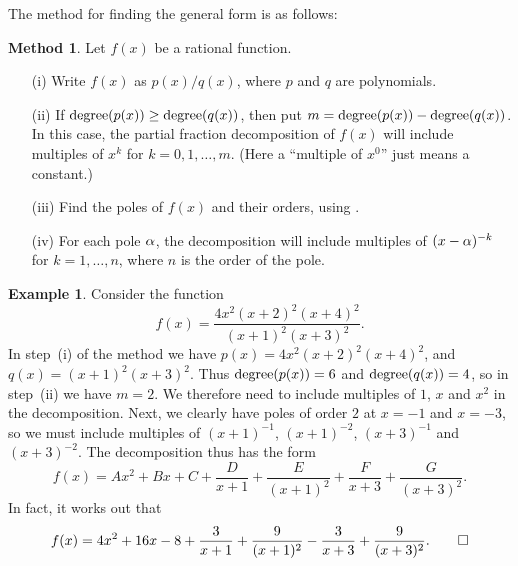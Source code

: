 \documentclass[a4paper]{book}
\theoremstyle{definition}
\newtheorem{example}[theorem]{Example}
\newtheorem{method}[theorem]{Method}
\begin{document}
The method for finding the general form is as follows:
\begin{method}
 Let $f(x)$ be a rational function.
 \begin{itemize}
  \item[(i)] Write $f(x)$ as $p(x)/q(x)$, where $p$ and $q$ are
   polynomials.
  \item[(ii)] If $\operatorname{degree}(p(x))\geq\operatorname{degree}(q(x))$, then put
   $m=\operatorname{degree}(p(x))-\operatorname{degree}(q(x))$.  In this case, the partial
   fraction decomposition of $f(x)$ will include multiples of $x^k$
   for $k=0,1,\dotsc,m$.  (Here a ``multiple of $x^0$'' just means a
   constant.) 
  \item[(iii)] Find the poles of $f(x)$ and their orders, using
   . 
  \item[(iv)] For each pole $\alpha$, the decomposition will include
   multiples of $(x-\alpha)^{-k}$ for $k=1,\dotsc,n$, where $n$ is the
   order of the pole.
 \end{itemize}
\end{method}
\begin{example}
 Consider the function
 \[ f(x) = \frac{4x^2(x+2)^2(x+4)^2}{(x+1)^2(x+3)^2}. \]
 In step~(i) of the method we have $p(x)=4x^2(x+2)^2(x+4)^2$, and
 $q(x)=(x+1)^2(x+3)^2$.  Thus $\operatorname{degree}(p(x))=6$ and $\operatorname{degree}(q(x))=4$,
 so in step~(ii) we have $m=2$.  We therefore need to include
 multiples of $1$, $x$ and $x^2$ in the decomposition.  Next, we
 clearly have poles of order $2$ at $x=-1$ and $x=-3$, so we must
 include multiples of $(x+1)^{-1}$, $(x+1)^{-2}$, $(x+3)^{-1}$ and
 $(x+3)^{-2}$.  The decomposition thus has the form
 \[ f(x) = Ax^2 + Bx + C +
           \frac{D}{x+1} + \frac{E}{(x+1)^2} + 
           \frac{F}{x+3} + \frac{G}{(x+3)^2}. 
 \]
 In fact, it works out that 
 \[ f(x) = 4x^2 + 16x - 8 +
           \frac{3}{x+1} + \frac{9}{(x+1)^2} - 
           \frac{3}{x+3} + \frac{9}{(x+3)^2}. \qed
 \]
\end{example}
\end{document}
